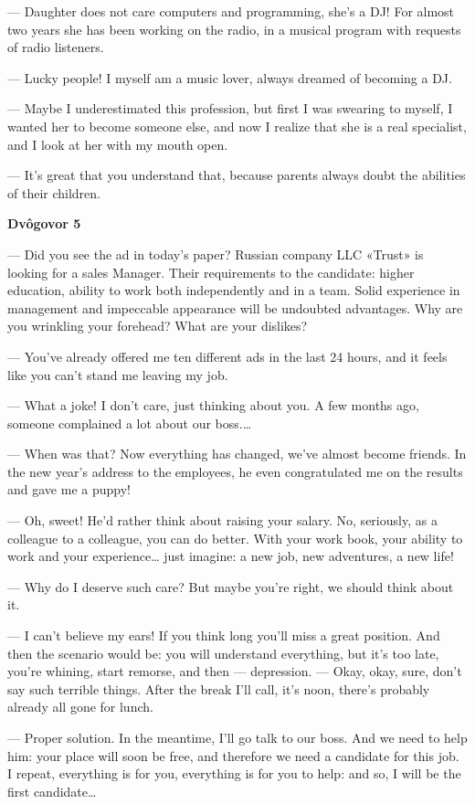 — Daughter does not care computers and programming, she’s a DJ! For almost two years she has been working on the radio, in a musical program with requests of radio listeners.

— Lucky people! I myself am a music lover, always dreamed of becoming a DJ.

— Maybe I underestimated this profession, but first I was swearing to myself, I wanted her to become someone else, and now I realize that she is a real specialist, and I look at her with my mouth open.

— It’s great that you understand that, because parents always doubt the abilities of their children.


\textbf{Dvôgovor 5}


— Did you see the ad in today’s paper? Russian company LLC «Trust» is looking for a sales Manager. Their requirements to the candidate: higher education, ability to work both independently and in a team. Solid experience in management and impeccable appearance will be undoubted advantages. Why are you wrinkling your forehead? What are your dislikes?

— You’ve already offered me ten different ads in the last 24 hours, and it feels like you can’t stand me leaving my job.

— What a joke! I don’t care, just thinking about you. A few months ago, someone complained a lot about our boss.…

— When was that? Now everything has changed, we’ve almost become friends. In the new year’s address to the employees, he even congratulated me on the results and gave me a puppy!

— Oh, sweet! He’d rather think about raising your salary. No, seriously, as a colleague to a colleague, you can do better. With your work book, your ability to work and your experience… just imagine: a new job, new adventures, a new life!

— Why do I deserve such care? But maybe you’re right, we should think about it.

— I can’t believe my ears! If you think long you’ll miss a great position. And then the scenario would be: you will understand everything, but it’s too late, you’re whining, start remorse, and then — depression.
— Okay, okay, sure, don’t say such terrible things. After the break I’ll call, it’s noon, there’s probably already all gone for lunch.

— Proper solution. In the meantime, I’ll go talk to our boss. And we need to help him: your place will soon be free, and therefore we need a candidate for this job. I repeat, everything is for you, everything is for you to help: and so, I will be the first candidate…


